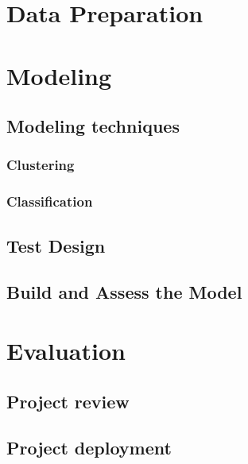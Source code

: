 \newpage

\newpage
\section*{Data Preparation}





\section*{Modeling}

\subsection*{Modeling techniques}
\subsubsection*{Clustering}

\subsubsection*{Classification}

\subsection*{Test Design}

\subsection*{Build and Assess the Model}


\section*{Evaluation}

\subsection*{Project review}

\subsection*{Project deployment}


